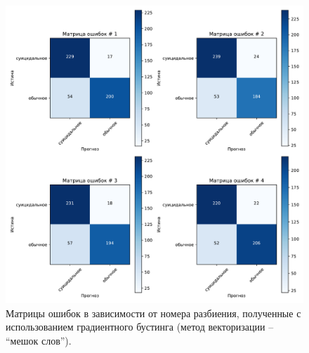 \begin{figure}[H]
	\centering
	\includegraphics[width=\textwidth]{inc/plots/gradientMatrBag.pdf}
	\caption{ Матрицы ошибок в зависимости от номера разбиения, полученные с использованием градиентного бустинга (метод векторизации -- ``мешок слов''). }
	\label{img:gradientMatrBag}
\end{figure}

